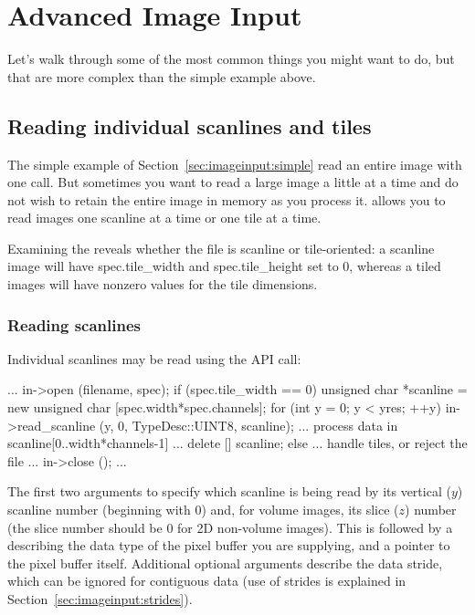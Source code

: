 \section{Advanced Image Input}
\label{sec:advancedimageinput}

Let's walk through some of the most common things you might want to do,
but that are more complex than the simple example above.


\subsection{Reading individual scanlines and tiles}
\label{sec:imageinput:scanlinestiles}

The simple example of Section~\ref{sec:imageinput:simple} read an
entire image with one call.  But sometimes you want to read a large
image a
little at a time and do not wish to retain the entire image in memory
as you process it.  \product allows you to read images
one scanline at a time or one tile at a time.

Examining the \ImageSpec reveals whether the file is scanline or
tile-oriented: a scanline image will have {\cf spec.tile_width} 
and {\cf spec.tile_height} set to 0, whereas a tiled images will
have nonzero values for the tile dimensions.


\subsubsection{Reading scanlines}

Individual scanlines may be read using the \readscanline API
call:

\begin{code}
        ...
        in->open (filename, spec);
        if (spec.tile_width == 0) {
            unsigned char *scanline = new unsigned char [spec.width*spec.channels];
            for (int y = 0;  y < yres;  ++y) {
                in->read_scanline (y, 0, TypeDesc::UINT8, scanline);
                ... process data in scanline[0..width*channels-1] ...
            }
            delete [] scanline;
        } else {
            ... handle tiles, or reject the file ...
        }
        in->close ();
        ...
\end{code}

The first two arguments to \readscanline specify which scanline
is being read by its vertical ($y$) scanline number (beginning with 0)
and, for volume images, its slice ($z$) number (the slice number should
be 0 for 2D non-volume images).  This is followed by a \TypeDesc
describing the data type of the pixel buffer you are supplying, and a
pointer to the pixel buffer itself.  Additional optional arguments
describe the data stride, which can be ignored for contiguous data (use
of strides is explained in Section~\ref{sec:imageinput:strides}).

